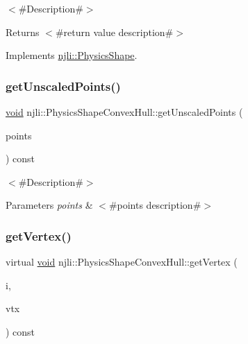 $<$\#\+Description\#$>$

\begin{DoxyReturn}{Returns}
$<$\#return value description\#$>$ 
\end{DoxyReturn}


Implements \mbox{\hyperlink{classnjli_1_1_physics_shape_ac7c6b2ac373892095f8220d56f8ad6de}{njli\+::\+Physics\+Shape}}.

\mbox{\label{classnjli_1_1_physics_shape_convex_hull_a6308f57aaa90f995867be22532bfcb02}} 
\subsubsection{\texorpdfstring{get\+Unscaled\+Points()}{getUnscaledPoints()}}
{\footnotesize\ttfamily \mbox{\hyperlink{_thread_8h_af1e856da2e658414cb2456cb6f7ebc66}{void}} njli\+::\+Physics\+Shape\+Convex\+Hull\+::get\+Unscaled\+Points (\begin{DoxyParamCaption}\item[{std\+::vector$<$ bt\+Vector3 $>$ \&}]{points }\end{DoxyParamCaption}) const}

$<$\#\+Description\#$>$


\begin{DoxyParams}{Parameters}
{\em points} & $<$\#points description\#$>$ \\
\hline
\end{DoxyParams}
\mbox{\label{classnjli_1_1_physics_shape_convex_hull_a274757f4f0bc1cf0e229c95c07fef7bd}} 
\subsubsection{\texorpdfstring{get\+Vertex()}{getVertex()}}
{\footnotesize\ttfamily virtual \mbox{\hyperlink{_thread_8h_af1e856da2e658414cb2456cb6f7ebc66}{void}} njli\+::\+Physics\+Shape\+Convex\+Hull\+::get\+Vertex (\begin{DoxyParamCaption}\item[{int}]{i,  }\item[{bt\+Vector3 \&}]{vtx }\end{DoxyParamCaption}) const\hspace{0.3cm}{\ttfamily [virtual]}}


